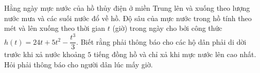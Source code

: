 \begin{ex}%
	Hằng ngày mực nước của hồ thủy điện ở miền Trung lên và xuống theo lượng nước mưa và các suối nước đổ về hồ. Độ sâu của mực nước trong hồ tính theo mét và lên xuống theo thời gian $t$ (giờ) trong ngày cho bởi công thức $h(t)=24t+5t^2-\dfrac{t^3}{3}$. Biết rằng phải thông báo cho các hộ dân phải di dời trước khi xả nước khoảng $5$ tiếng đồng hồ và chỉ xả khi mực nước lên cao nhất. Hỏi phải thông báo cho người dân lúc mấy giờ. 
\end{ex}

